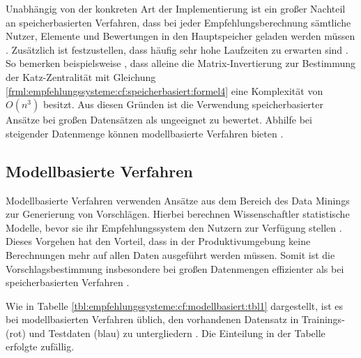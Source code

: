Unabhängig von der konkreten Art der Implementierung ist ein großer Nachteil an speicherbasierten Verfahren, dass bei jeder Empfehlungsberechnung sämtliche Nutzer, Elemente und Bewertungen in den Hauptspeicher geladen werden müssen \cite[S. 8]{yang:2016}. Zusätzlich ist festzustellen, dass häufig sehr hohe Laufzeiten zu erwarten sind \cite[S. 2]{zhang:2010}. So bemerken beispielsweise \textcite[S. 3]{landherr:2010}, dass alleine die Matrix-Invertierung zur Bestimmung der Katz-Zentralität mit Gleichung \ref{frml:empfehlungssysteme:cf:speicherbasiert:formel4} eine Komplexität von $O(n^3)$ besitzt. Aus diesen Gründen ist die Verwendung speicherbasierter Ansätze bei großen Datensätzen als ungeeignet zu bewertet. Abhilfe bei steigender Datenmenge können modellbasierte Verfahren bieten \cite[S. 8]{yang:2016}.


\subsection{Modellbasierte Verfahren}
\label{ch:empfehlungssysteme:cf:modellbasiert}
Modellbasierte Verfahren verwenden Ansätze aus dem Bereich des Data Minings zur Generierung von Vorschlägen. Hierbei berechnen Wissenschaftler statistische Modelle, bevor sie ihr Empfehlungssystem den Nutzern zur Verfügung stellen \cite[S. 2]{cui:2020}. Dieses Vorgehen hat den Vorteil, dass in der Produktivumgebung keine Berechnungen mehr auf allen Daten ausgeführt werden müssen. Somit ist die Vorschlagsbestimmung insbesondere bei großen Datenmengen effizienter als bei speicherbasierten Verfahren \cite[S. 8]{yang:2016}.

Wie in Tabelle \ref{tbl:empfehlungssysteme:cf:modellbasiert:tbl1} dargestellt, ist es bei modellbasierten Verfahren üblich, den vorhandenen Datensatz in Trainings- (rot) und Testdaten (blau) zu untergliedern \cite[S. 71f.]{recommenderSystems:2016}. Die Einteilung in der Tabelle erfolgte zufällig.%


